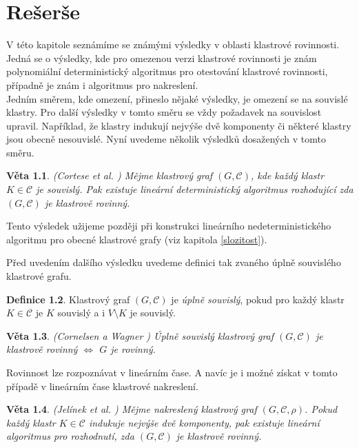 \documentclass[12pt,a4report]{report}
\newtheorem{theorem}{Věta}[chapter]
\theoremstyle{definition}
\newtheorem{defn}[theorem]{Definice}
\begin{document}
\author{Filip Šedivý}

\chapter{Rešerše}
V této kapitole seznámíme se známými výsledky v oblasti klastrové rovinnosti. Jedná se o výsledky, kde pro omezenou verzi klastrové rovinnosti je znám polynomiální deterministický algoritmus pro otestování klastrové rovinnosti, případně je znám i algoritmus pro nakreslení.\\

Jedním směrem, kde omezení, přineslo nějaké výsledky, je omezení se na souvislé klastry. Pro další výsledky v tomto směru se vždy požadavek na souvislost upravil. Například, že klastry indukují nejvýše dvě komponenty či některé klastry jsou obecně nesouvislé. Nyní uvedeme několik výsledků dosažených v tomto směru.

\begin{theorem}(Cortese et al. \cite{CorteseEtAl08})
\label{souv_klastry_det_alg}
Mějme klastrový graf $(G, \mathcal C)$, kde každý klastr $K \in \mathcal C$ je souvislý. Pak existuje lineární deterministický algoritmus rozhodující zda $(G, \mathcal C)$ je klastrově rovinný.
\end{theorem}

Tento výsledek užijeme později při konstrukci lineárního nedeterministického algoritmu pro obecné klastrové grafy (viz kapitola \ref{slozitost}).

Před uvedením dalšího výsledku uvedeme definici tak zvaného úplně souvislého klastrové grafu.

\begin{defn}
Klastrový graf $(G, \mathcal C)$ je \textit{úplně souvislý}, pokud pro každý klastr $K \in \mathcal C$ je $K$ souvislý a i $V \setminus K$ je souvislý.
\end{defn}

\begin{theorem}(Cornelsen a Wagner \cite{CornelsenWagner03})
Úplně souvislý klastrový graf $(G, \mathcal C)$ je  klastrově rovinný $\iff$ $G$ je rovinný.
\end{theorem}

Rovinnost lze rozpoznávat v lineárním čase. A navíc je i možné získat v tomto případě v lineárním čase klastrové nakreslení.

\begin{theorem}(Jelínek et al. \cite{JelinekEtAl08})
Mějme nakreslený klastrový graf $(G, \mathcal C, \rho)$. Pokud každý klastr $K \in \mathcal C$ indukuje nejvýše dvě komponenty, pak existuje lineární algoritmus pro rozhodnutí, zda $(G, \mathcal C)$ je klastrově rovinný.
\end{theorem}
\end{document}

